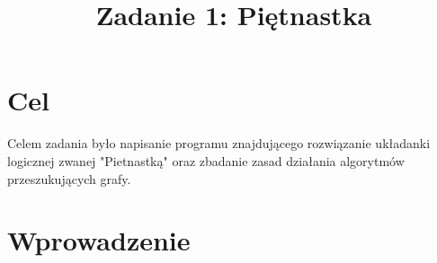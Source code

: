 \documentclass{classrep}
\author{
    \studentinfo{Mateusz Giełczyński}{247662} \and
    \studentinfo{Jakub Kubiś}{247712}
}
\title{Zadanie 1: Piętnastka}
\begin{document}
    \maketitle





    \section{Cel}
    {
        Celem zadania było napisanie programu znajdującego rozwiązanie układanki logicznej zwanej "Pietnastką" oraz zbadanie zasad działania
        algorytmów przeszukujących grafy.
    }\label{sec:cel}

    \section{Wprowadzenie}
\end{document}

